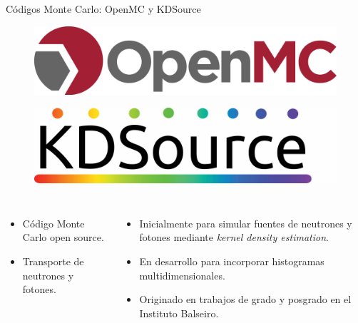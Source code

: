 \documentclass[aspectratio=169,english]{beamer}
\begin{document}
\begin{frame}{Códigos Monte Carlo: OpenMC y KDSource}
    \begin{figure}
        \centering
        \begin{minipage}{0.35\textwidth}
            \centering
            \includegraphics[width=\linewidth]{imagens/openmc.png}
            \label{fig:openmc}
        \end{minipage}\hfill
        \begin{minipage}{0.35\textwidth}
            \centering
            \includegraphics[width=\linewidth]{imagens/esquema3.png}
            \label{fig:esquema3}
        \end{minipage}
    \end{figure}

    \begin{columns}[t]
            \begin{itemize}
                \item Código Monte Carlo open source.
                \item Transporte de neutrones y fotones.
            \end{itemize}
            \begin{itemize}
                \item Inicialmente para simular fuentes de neutrones y fotones mediante \textit{kernel density estimation}.
                \item En desarrollo para incorporar histogramas multidimensionales.
                \item Originado en trabajos de grado y posgrado en el Instituto Balseiro.
            \end{itemize}
    \end{columns}
\end{frame}
\end{document}
